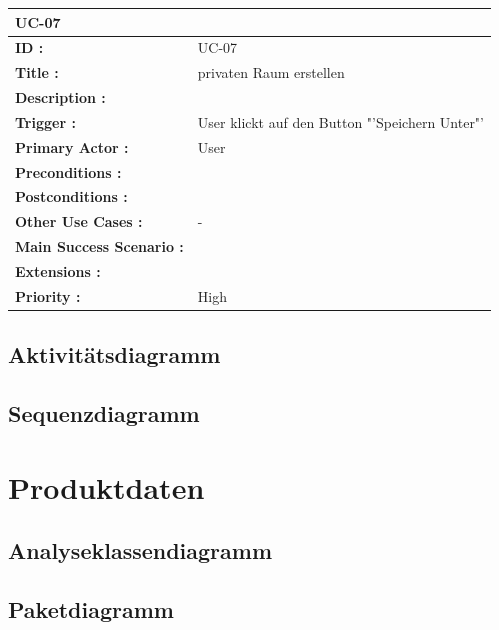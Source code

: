 	\begin{table}[H]
		\begin{tabular}{|p{8cm}|p{8cm}|}
			\hline
			\textbf{UC-07 } \\ 
			\hline
			\textbf{ID :}\centering & UC-07  \\ \hline 
			\textbf{Title :}\centering & privaten Raum erstellen \\ \hline 
			\textbf{Description :}\centering &  \\ \hline 
			\textbf{Trigger :}\centering & User klickt auf den Button "'Speichern Unter"' \\ \hline 
			\textbf{Primary Actor :} \centering & User \\ \hline 
			\textbf{Preconditions :}\centering & \\ \hline 
			\textbf{Postconditions :}\centering	& 
			\\ \hline		
			\textbf{Other Use Cases :}\centering & - \\ \hline  
			\textbf{Main Success Scenario :}\centering &
			\\ \hline  
			\textbf{Extensions :}\centering & \\ \hline  
			\textbf{Priority :}\centering & High \\ \hline  
		\end{tabular}
	\end{table}			
	
	\subsection{Aktivitätsdiagramm}

	\subsection{Sequenzdiagramm}
	
	
\newpage
	\section{\Large Produktdaten}
	
	\subsection{Analyseklassendiagramm}	
	
	\subsection{Paketdiagramm}
	
